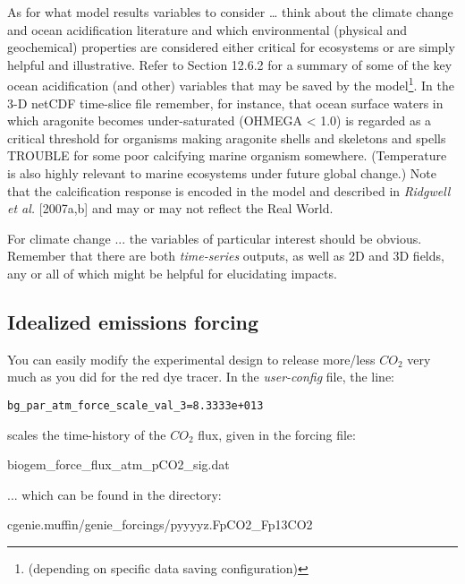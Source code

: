 \documentclass[11pt,fleqn]{book} %
\begin{document}
As for what model results variables to consider … think about the climate change and ocean acidification literature and which environmental (physical and geochemical) properties are considered either critical for ecosystems or are simply helpful and illustrative. Refer to Section 12.6.2 for a summary of some of the key ocean acidification (and other) variables that may be saved by the model\footnote{(depending on specific data saving configuration)}. 
In the 3-D netCDF time-slice file remember, for instance, that ocean surface waters in which aragonite becomes under-saturated (OHMEGA < 1.0) is regarded as a critical threshold for organisms making aragonite shells and skeletons and spells TROUBLE for some poor calcifying marine organism somewhere. (Temperature is also highly relevant to marine ecosystems under future global change.) Note that the calcification response is encoded in the model and described in \textit{Ridgwell et al.} [2007a,b] and may or may not reflect the Real World.

For climate change ... the variables of particular interest should be obvious. Remember that there are both \textit{time-series} outputs, as well as  2D and 3D fields, any or all of which might be  helpful for elucidating impacts.


\subsection{Idealized emissions forcing}

\noindent You can easily modify the experimental design to release more/less \(CO_{2}\) very much as you did for the red dye tracer. In the \textit{user-config} file, the line:
\vspace{-2pt}\begin{verbatim}
bg_par_atm_force_scale_val_3=8.3333e+013
\end{verbatim}\vspace{-2pt}
scales the time-history of the  \(CO_{2}\) flux, given in the forcing file:

\vspace{2pt}
\noindent \footnotesize\textsf{biogem\_force\_flux\_atm\_pCO2\_sig.dat}\normalsize
\vspace{2pt}
 
\noindent ... which can be found in the directory:

\vspace{2pt}
\noindent \footnotesize\textsf{cgenie.muffin/genie\_forcings/pyyyyz.FpCO2\_Fp13CO2}\normalsize
\vspace{2pt}
\end{document}
